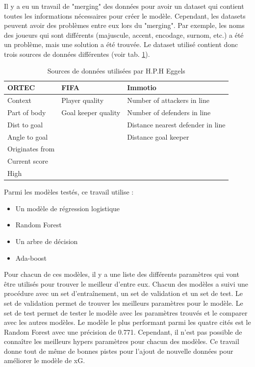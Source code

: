 \documentclass[12pt]{article}
\begin{document}
Il y a eu un travail de "merging" des données pour avoir un dataset qui contient toutes les informations nécessaires pour créer le modèle.
Cependant, les datasets peuvent avoir des problèmes entre eux lors du "merging".
Par exemple, les noms des joueurs qui sont différents (majuscule, accent, encodage, surnom, etc.) a été un problème, mais une solution a été trouvée.
\newline
Le dataset utilisé contient donc trois sources de données différentes (voir tab. \ref{tab:data_from_eggels}).
\begin{table}[htp]
    \centering
    \begin{tabular}{lll}
        \hline
        \textbf{ORTEC}  & \textbf{FIFA}       & \textbf{Immotio}                  \\ \hline
        Context         & Player quality      & Number of attackers in line       \\
        Part of body    & Goal keeper quality & Number of defenders in line       \\
        Dist to goal    &                     & Distance nearest defender in line \\
        Angle to goal   &                     & Distance goal keeper              \\
        Originates from &                     &                                   \\
        Current score   &                     &                                   \\
        High            &                     &                                   \\ \hline
    \end{tabular}
    \caption{Sources de données utilisées par H.P.H Eggels}
    \label{tab:data_from_eggels}
\end{table}
\newpage
Parmi les modèles testés, ce travail utilise :
\begin{itemize}
    \item Un modèle de régression logistique
    \item Random Forest
    \item Un arbre de décision
    \item Ada-boost
\end{itemize}
Pour chacun de ces modèles, il y a une liste des différents paramètres qui vont être utilisés pour trouver le meilleur d'entre eux.
Chacun des modèles a suivi une procédure avec un set d'entraînement, un set de validation et un set de test.
Le set de validation permet de trouver les meilleurs paramètres pour le modèle.
Le set de test permet de tester le modèle avec les paramètres trouvés et le comparer avec les autres modèles.
Le modèle le plus performant parmi les quatre cités est le Random Forest avec une précision de 0.771.
Cependant, il n'est pas possible de connaître les meilleurs hypers paramètres pour chacun des modèles.
Ce travail donne tout de même de bonnes pistes pour l'ajout de nouvelle données pour améliorer le modèle de xG.
\newpage
\end{document}
